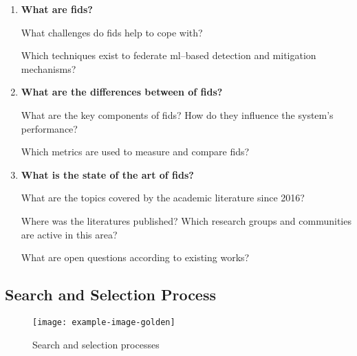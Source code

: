 \begin{enumerate}[label=\textbf{\arabic*)}]
    \item \textbf{What are \gls{fids}?}
        \begin{RQ}{1.1} \label{rq:sota.challenges}
            What challenges do \gls{fids} help to cope with?
        \end{RQ}
        \begin{RQ}{1.2} \label{rq:sota.techniques}
            Which techniques exist to federate \gls{ml}--based detection and
            mitigation mechanisms?
        \end{RQ}

    \item \textbf{What are the differences between of \gls{fids}?}
        \begin{RQ}{2.1} \label{rq:sota.components}
            What are the key components of \gls{fids}? How do they influence
            the system's performance?
        \end{RQ}
        \begin{RQ}{2.2} \label{rq:sota.metrics}
            Which metrics are used to measure and compare \gls{fids}?
        \end{RQ}
    
    \item \textbf{What is the state of the art of \gls{fids}?}
        \begin{RQ}{3.1} \label{rq:sota.literature}
            What are the topics covered by the academic literature since 2016?
        \end{RQ}
        \begin{RQ}{3.2} \label{rq:sota.wherewho}
            Where was the literatures published? Which research groups and communities
            are active in this area?
        \end{RQ}
        \begin{RQ}{3.3} \label{rq:sota.open}
            What are open questions according to existing works?
        \end{RQ}
\end{enumerate}


\subsection{Search and Selection Process\label{sec:sota.methodo.search}}


\begin{figure}
  \centering
  \texttt{[image: example-image-golden]}
  \caption{Search and selection processes}
  \label{fig:methodo.original}
\end{figure}

